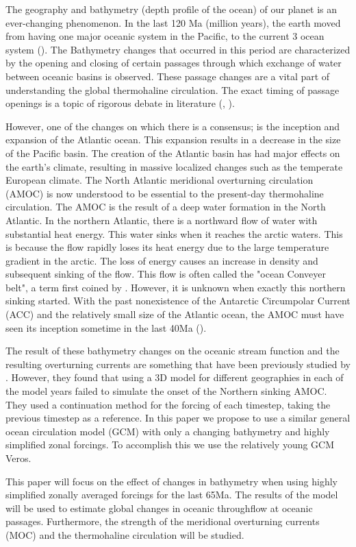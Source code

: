 The geography and bathymetry (depth profile of the ocean) of our planet is an ever-changing phenomenon. In the last 120 Ma (million years), the earth moved from having one major oceanic system in the Pacific, to the current 3 ocean system (\cite{besse2002apparent}). The Bathymetry changes that occurred in this period are characterized by the opening and closing of certain passages through which exchange of water between oceanic basins is observed. These passage changes are a vital part of understanding the global thermohaline circulation.  The exact timing of passage openings is a topic of rigorous debate in literature (\cite{Scher2006Apr}, \cite{Schmidt2007Jan}).

However, one of the changes on which there is a consensus; is the inception and expansion of the Atlantic ocean. This expansion results in a decrease in the size of the Pacific basin. The creation of the Atlantic basin has had major effects on the earth's climate, resulting in massive localized changes such as the temperate European climate. The North Atlantic meridional overturning circulation (AMOC) is now understood to be essential to the present-day thermohaline circulation. The AMOC is the result of a deep water formation in the North Atlantic. In the northern Atlantic, there is a northward flow of water with substantial heat energy. This water sinks when it reaches the arctic waters. This is because the flow rapidly loses its heat energy due to the large temperature gradient in the arctic. The loss of energy causes an increase in density and subsequent sinking of the flow. This flow is often called the "ocean Conveyer belt", a term first coined by \cite{broecker1991great}. However, it is unknown when exactly this northern sinking started. With the past nonexistence of the Antarctic Circumpolar Current (ACC) and the relatively small size of the Atlantic ocean, the AMOC must have seen its inception sometime in the last 40Ma (\cite{Abelson2017onset}). 

The result of these bathymetry changes on the oceanic stream function and the resulting overturning currents are something that have been previously studied by \cite{Mulder2017Jul}. However, they found that using a 3D model for different geographies in each of the model years failed to simulate the onset of the Northern sinking AMOC. They used a continuation method for the forcing of each timestep, taking the previous timestep as a reference. In this paper we propose to use a similar general ocean circulation model (GCM) with only a changing bathymetry and highly simplified zonal forcings. To accomplish this we use the relatively young GCM Veros.

This paper will focus on the effect of changes in bathymetry when using highly simplified zonally averaged forcings for the last 65Ma. The results of the model will be used to estimate global changes in oceanic throughflow at oceanic passages. Furthermore, the strength of the meridional overturning currents (MOC) and the thermohaline circulation will be studied.

